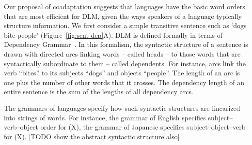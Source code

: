 \documentclass[9pt,twocolumn,twoside,lineno]{pnas-new}
\begin{document}
Our proposal of coadaptation suggests that languages have the basic word orders that are most efficient for DLM, given the ways speakers of a language typically structure information.
We first consider a simple transitive sentence such as `dogs bite people' (Figure~\ref{fig:sent-dep}A). 
DLM is defined formally in terms of Dependency Grammar~\citep{hays1964dependency,hudson1984word,melcuk1988dependency,corbett1993heads,tesniere2015elements}.
In this formalism, the syntactic structure of a sentence is drawn with directed arcs linking words -- called heads -- to those words that are syntactically subordinate to them -- called dependents.
For instance, arcs link the verb ``bites'' to its subjects ``dogs'' and objects ``people''.
The length of an arc is one plus the number of other words that it crosses.
The dependency length of an entire sentence is the sum of the lengths of all dependency arcs.

The grammars of languages specify how such syntactic structures are linearized into strings of words.
{\color{blue}For instance, the grammar of English specifies subject--verb--object order for (X), the grammar of Japanese specifies subject--object--verb for (X).
[TODO show the abstract syntactic structure also]}


%
%
\end{document}
